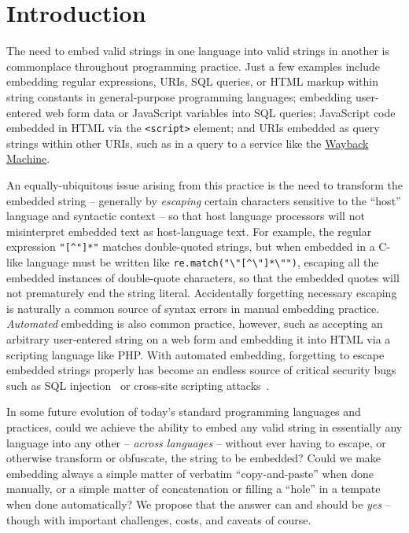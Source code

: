 \section{Introduction}
\label{sec:intro}

The need to embed valid strings in one language into valid strings in another
is commonplace throughout programming practice.
Just a few examples include embedding
regular expressions, URIs, SQL queries, or HTML markup
within string constants in general-purpose programming languages;
embedding user-entered web form data or JavaScript variables into SQL queries;
JavaScript code embedded in HTML via the \verb|<script>| element;
and URIs embedded as query strings within other URIs,
such as in a query to a service like the
\href{https://archive.org/web/}{Wayback Machine}.

An equally-ubiquitous issue arising from this practice
is the need to transform the embedded string --
generally by \emph{escaping} certain characters sensitive
to the ``host'' language and syntactic context --
so that host language processors will not misinterpret embedded text
as host-language text.
For example,
the regular expression \verb|"[^"]*"| matches double-quoted strings,
but when embedded in a C-like language must be written
like \verb|re.match("\"[^\"]*\"")|,
escaping all the embedded instances of double-quote characters,
so that the embedded quotes will not prematurely end the string literal.
Accidentally forgetting necessary escaping
is naturally a common source of syntax errors in manual embedding practice.
\emph{Automated} embedding is also common practice, however,
such as accepting an arbitrary user-entered string on a web form
and embedding it into HTML via a scripting language like PHP.
With automated embedding,
forgetting to escape embedded strings properly
has become an endless source of critical security bugs
such as SQL injection~\cite{clarke12sql}
or cross-site scripting attacks~\cite{fogie07xss}.

In some future evolution
of today's standard programming languages and practices,
could we achieve the ability to embed any valid string
in essentially any language into any other --
\emph{across languages} --
without ever having to escape, or otherwise transform or obfuscate,
the string to be embedded?
Could we make embedding always a simple matter of verbatim ``copy-and-paste''
when done manually,
or a simple matter of concatenation
or filling a ``hole'' in a tempate
when done automatically?
We propose that the answer can and should be \emph{yes} --
though with important challenges, costs, and caveats of course.

